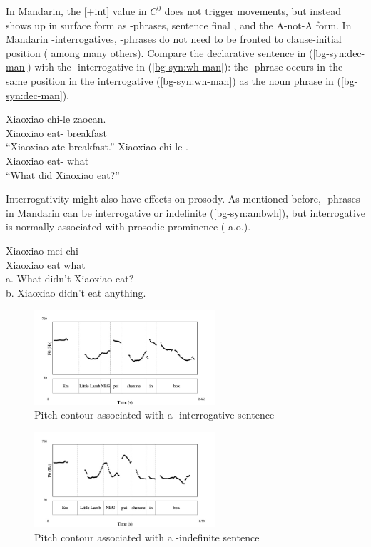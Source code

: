 In Mandarin, the [+int] value in $C^{0}$ does not trigger movements, but instead shows up in surface form as \twh-phrases, sentence final , and the A-not-A form. In Mandarin \twh-interrogatives, \twh-phrases  do not need to be fronted to clause-initial position (\citealt{huang1982, cheng1991} among many others). Compare the declarative sentence in (\ref{bg-syn:dec-man}) with the \twh-interrogative in (\ref{bg-syn:wh-man}): the \twh-phrase  occurs in the same position in the interrogative (\ref{bg-syn:wh-man}) as the noun phrase  in (\ref{bg-syn:dec-man}). 


\gll Xiaoxiao	chi-le zaocan.\\
Xiaoxiao eat-\Asp{} breakfast \\
``Xiaoxiao ate breakfast.''
\eex
{}
\gll Xiaoxiao	chi-le .\\
Xiaoxiao eat-\Asp{} what \\
``What did Xiaoxiao eat?''
\eex


Interrogativity might also have effects on prosody. As mentioned before, \twh-phrases in Mandarin can be interrogative or indefinite (\ref{bg-syn:ambwh}), but interrogative \twh{} is normally associated with prosodic prominence (\cite{hu2002prosody, dong2009, yangyang2018} a.o.).

\gll Xiaoxiao	mei	chi	\\
Xiaoxiao	\Neg{}	eat	what\\
a.	What didn't Xiaoxiao eat?\\
b.	Xiaoxiao didn't eat anything.\\
\eex

\begin{figure}[H]
    \centering
    \includegraphics[width=0.6\textwidth]{figures/pitch-FC1wh.jpg}
    \caption{Pitch contour associated with a \twh-interrogative sentence}
    \label{fig:man:wh1}
\end{figure}

\begin{figure}[H]
    \centering
    \includegraphics[width=0.6\textwidth]{figures/pitch-FC0wh.jpg}
    \caption{Pitch contour associated with a \twh-indefinite sentence}
    \label{fig:man:wh0}
\end{figure}

